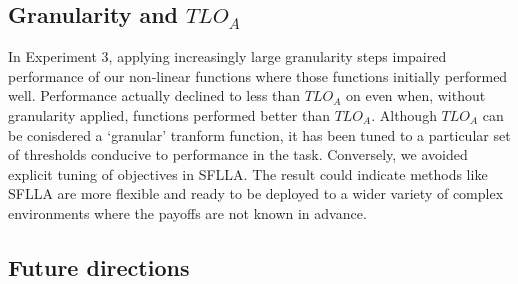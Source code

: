 







\subsection{Granularity and $TLO_A$}

In Experiment 3, applying increasingly large granularity steps impaired performance of our non-linear functions where those functions initially performed well. Performance actually declined to less than $TLO_A$ on even when, without granularity applied, functions performed better than $TLO_A$. Although $TLO_A$ can be conisdered a `granular' tranform function, it has been tuned to a particular set of thresholds conducive to performance in the task. Conversely, we avoided explicit tuning of objectives in SFLLA. The result could indicate methods like SFLLA are more flexible and ready to be deployed to a wider variety of complex environments where the payoffs are not known in advance.

\subsection{Future directions}

